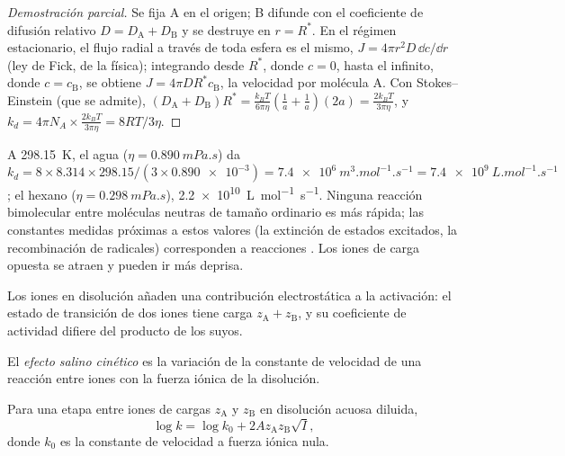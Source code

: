 \begin{proof}[Demostración parcial]
Se fija A en el origen; B difunde con el coeficiente de difusión relativo $D =
D_{\mathrm A} + D_{\mathrm B}$ y se destruye en $r = R^*$. En el régimen estacionario, el flujo radial
a través de toda esfera es el mismo, $J = 4\pi r^2D\,\dd c/\dd r$ (ley de Fick, de la
física); integrando desde $R^*$, donde $c = 0$, hasta el infinito, donde $c = c_{\mathrm B}$, se obtiene
$J = 4\pi DR^*c_{\mathrm B}$, la velocidad por molécula A. Con Stokes--Einstein (que se admite),
$(D_{\mathrm A} + D_{\mathrm B})R^* = \frac{k_BT}{6\pi\eta}(\frac{1}{a} + \frac1a)(2a) = \frac{2k_BT}{3\pi\eta}$, y $k_d = 4\pi N_A \times
\frac{2k_BT}{3\pi\eta} = 8RT/3\eta$.
\end{proof}

\begin{example}\label{ex:b3:rate-theories:speed-limit}
A \qty{298.15}{K}, el agua ($\eta = \qty{0.890}{mPa.s}$) da $k_d = 8 \times 8.314 \times
298.15/(3 \times \num{0.890e-3}) = \qty{7.4e6}{m^3.mol^{-1}.s^{-1}} = \qty{7.4e9}{L.mol^{-1}.s^{-1}}$; el hexano
($\eta = \qty{0.298}{mPa.s}$), \qty{2.2e10}{L.mol^{-1}.s^{-1}}. Ninguna reacción bimolecular entre
moléculas neutras de tamaño ordinario es más rápida; las constantes medidas próximas a estos
valores (la extinción de estados excitados, la recombinación de radicales) corresponden a reacciones
. Los iones de carga opuesta se atraen y pueden ir más deprisa.
\end{example}

Los iones en disolución añaden una contribución electrostática a la activación: el
estado de transición de dos iones tiene carga $z_{\mathrm A} + z_{\mathrm B}$, y su coeficiente de actividad
difiere del producto de los suyos.

\begin{definition}\label{def:b3:rate-theories:salt}
El \emph{efecto salino cinético} es la variación de la constante de
velocidad de una reacción entre iones con la fuerza iónica de la disolución.
\end{definition}

\begin{proposition}\label{prop:b3:rate-theories:bronsted-bjerrum}
Para una etapa entre iones de cargas $z_{\mathrm A}$ y $z_{\mathrm B}$ en disolución acuosa diluida,
\[
  \log k = \log k_0 + 2Az_{\mathrm A}z_{\mathrm B}\sqrt I,
\]
donde $k_0$ es la constante de velocidad a fuerza iónica nula.
\end{proposition}

